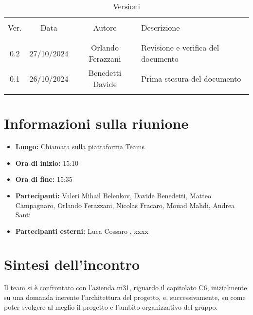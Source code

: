 \documentclass[italian, 12pt]{article}
\begin{document}
\pagestyle{mystyle}


\begin{table}[!h]
	\caption{Versioni}
	\begin{center}
		\begin{tabular}{ c c c p{9cm}}
			\hline \\[-2ex]
			Ver. & Data & Autore & Descrizione \\
			\\[-2ex] \hline \\[-1.5ex]
            0.2 & 27/10/2024 & Orlando Ferazzani & Revisione e verifica del documento \\
			0.1 & 26/10/2024 & Benedetti Davide & Prima stesura del documento\\
			\\[-1.5ex] \hline
		\end{tabular}
	\end{center}
\end{table}


\tableofcontents
\newpage


\section{Informazioni sulla riunione}
\begin{itemize}
    \item \textbf{Luogo:} Chiamata sulla piattaforma Teams
    \item \textbf{Ora di inizio:} 15:10
    \item \textbf{Ora di fine:} 15:35
    \item \textbf{Partecipanti:} Valeri Mihail Belenkov, Davide Benedetti, Matteo Campagnaro, Orlando Ferazzani, Nicolas Fracaro, Mouad Mahdi, Andrea Santi 
    \item \textbf{Partecipanti esterni:} Luca Cossaro , xxxx
\end{itemize}

\section{Sintesi dell'incontro}
Il team si è confrontato con l'azienda m31, riguardo il capitolato C6, inizialmente su una domanda inerente l'architettura del progetto, e, successivamente, su come poter svolgere al meglio il progetto e l'ambito organizzativo del gruppo.
\end{document}
